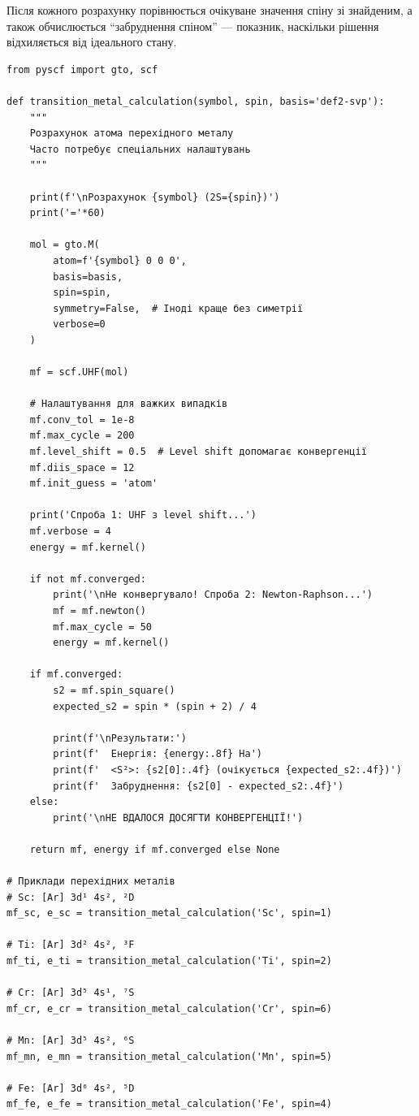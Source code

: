 Після кожного розрахунку порівнюється очікуване значення спіну зі знайденим, а також обчислюється ``забруднення спіном'' --- показник, наскільки рішення відхиляється від ідеального стану.

\begin{verbatim}
from pyscf import gto, scf

def transition_metal_calculation(symbol, spin, basis='def2-svp'):
    """
    Розрахунок атома перехідного металу
    Часто потребує спеціальних налаштувань
    """

    print(f'\nРозрахунок {symbol} (2S={spin})')
    print('='*60)

    mol = gto.M(
        atom=f'{symbol} 0 0 0',
        basis=basis,
        spin=spin,
        symmetry=False,  # Іноді краще без симетрії
        verbose=0
    )

    mf = scf.UHF(mol)

    # Налаштування для важких випадків
    mf.conv_tol = 1e-8
    mf.max_cycle = 200
    mf.level_shift = 0.5  # Level shift допомагає конвергенції
    mf.diis_space = 12
    mf.init_guess = 'atom'

    print('Спроба 1: UHF з level shift...')
    mf.verbose = 4
    energy = mf.kernel()

    if not mf.converged:
        print('\nНе конвергувало! Спроба 2: Newton-Raphson...')
        mf = mf.newton()
        mf.max_cycle = 50
        energy = mf.kernel()

    if mf.converged:
        s2 = mf.spin_square()
        expected_s2 = spin * (spin + 2) / 4

        print(f'\nРезультати:')
        print(f'  Енергія: {energy:.8f} Ha')
        print(f'  <S²>: {s2[0]:.4f} (очікується {expected_s2:.4f})')
        print(f'  Забруднення: {s2[0] - expected_s2:.4f}')
    else:
        print('\nНЕ ВДАЛОСЯ ДОСЯГТИ КОНВЕРГЕНЦІЇ!')

    return mf, energy if mf.converged else None

# Приклади перехідних металів
# Sc: [Ar] 3d¹ 4s², ²D
mf_sc, e_sc = transition_metal_calculation('Sc', spin=1)

# Ti: [Ar] 3d² 4s², ³F
mf_ti, e_ti = transition_metal_calculation('Ti', spin=2)

# Cr: [Ar] 3d⁵ 4s¹, ⁷S
mf_cr, e_cr = transition_metal_calculation('Cr', spin=6)

# Mn: [Ar] 3d⁵ 4s², ⁶S
mf_mn, e_mn = transition_metal_calculation('Mn', spin=5)

# Fe: [Ar] 3d⁶ 4s², ⁵D
mf_fe, e_fe = transition_metal_calculation('Fe', spin=4)
\end{verbatim}


